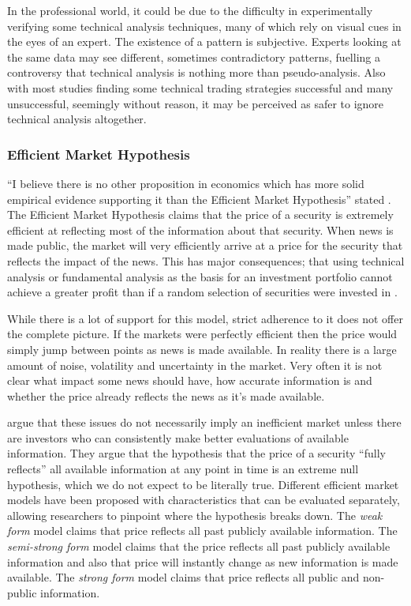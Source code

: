 \documentclass[12pt, oneside, a4paper]{article}
\theoremstyle{definition}
\begin{document}
In the professional world, it could be due to the difficulty in experimentally verifying some technical analysis techniques, many of which rely on visual cues in the eyes of an expert. The existence of a pattern is subjective. Experts looking at the same data may see different, sometimes contradictory patterns, fuelling a controversy that technical analysis is nothing more than pseudo-analysis. Also with most studies finding some technical trading strategies successful and many unsuccessful, seemingly without reason, it may be perceived as safer to ignore technical analysis altogether.

\subsubsection{Efficient Market Hypothesis}
\label{emh}
``I believe there is no other proposition in economics which has more solid empirical evidence supporting it than the Efficient Market Hypothesis'' stated \cite{jensen1978some}. The Efficient Market Hypothesis claims that the price of a security is extremely efficient at reflecting most of the information about that security. When news is made public, the market will very efficiently arrive at a price for the security that reflects the impact of the news. This has major consequences; that using technical analysis or fundamental analysis as the basis for an investment portfolio cannot achieve a greater profit than if a random selection of securities were invested in \citep{emhAndCritics}.

While there is a lot of support for this model, strict adherence to it does not offer the complete picture. If the markets were perfectly efficient then the price would simply jump between points as news is made available. In reality there is a large amount of noise, volatility and uncertainty in the market. Very often it is not clear what impact some news should have, how accurate information is and whether the price already reflects the news as it's made available.

\cite{malkiel1970efficient} argue that these issues do not necessarily imply an inefficient market unless there are investors who can consistently make better evaluations of available information. They argue that the hypothesis that the price of a security ``fully reflects'' all available information at any point in time is an extreme null hypothesis, which we do not expect to be literally true. Different efficient market models have been proposed with characteristics that can be evaluated separately, allowing researchers to pinpoint where the hypothesis breaks down. The \textit{weak form} model claims that price reflects all past publicly available information. The \textit{semi-strong form} model claims that the price reflects all past publicly available information and also that price will instantly change as new information is made available. The \textit{strong form} model claims that price reflects all public and non-public information.
\end{document}
